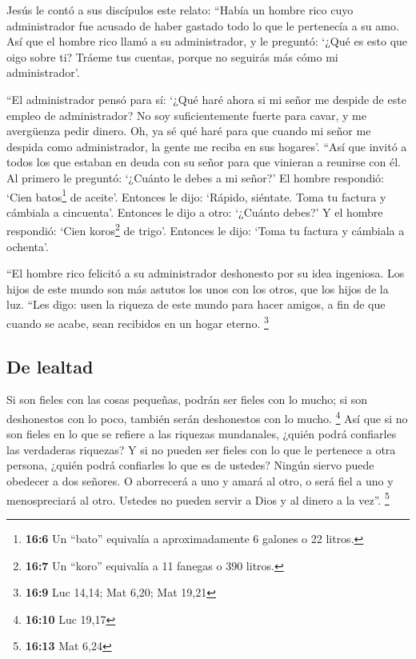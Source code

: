  Jesús le contó a sus discípulos este relato: ``Había un
hombre rico cuyo administrador fue acusado de haber gastado todo lo que
le pertenecía a su amo.  Así que el hombre rico llamó a su
administrador, y le preguntó: `¿Qué es esto que oigo sobre ti? Tráeme
tus cuentas, porque no seguirás más cómo mi administrador'.

 ``El administrador pensó para sí: `¿Qué haré ahora si mi
señor me despide de este empleo de administrador? No soy suficientemente
fuerte para cavar, y me avergüenza pedir dinero.  Oh, ya
sé qué haré para que cuando mi señor me despida como administrador, la
gente me reciba en sus hogares'.  ``Así que invitó a todos
los que estaban en deuda con su señor para que vinieran a reunirse con
él. Al primero le preguntó: `¿Cuánto le debes a mi señor?'
 El hombre respondió: `Cien batos\footnote{\textbf{16:6}
  Un ``bato'' equivalía a aproximadamente 6 galones o 22 litros.} de
aceite'. Entonces le dijo: `Rápido, siéntate. Toma tu factura y cámbiala
a cincuenta'.  Entonces le dijo a otro: `¿Cuánto debes?' Y
el hombre respondió: `Cien koros\footnote{\textbf{16:7} Un ``koro''
  equivalía a 11 fanegas o 390 litros.} de trigo'. Entonces le dijo:
`Toma tu factura y cámbiala a ochenta'.

 ``El hombre rico felicitó a su administrador deshonesto
por su idea ingeniosa. Los hijos de este mundo son más astutos los unos
con los otros, que los hijos de la luz.  ``Les digo: usen
la riqueza de este mundo para hacer amigos, a fin de que cuando se
acabe, sean recibidos en un hogar eterno. \footnote{\textbf{16:9} Luc
  14,14; Mat 6,20; Mat 19,21}

\hypertarget{de-lealtad}{%
\subsection{De lealtad}\label{de-lealtad}}

 Si son fieles con las cosas pequeñas, podrán ser fieles
con lo mucho; si son deshonestos con lo poco, también serán deshonestos
con lo mucho. \footnote{\textbf{16:10} Luc 19,17}  Así
que si no son fieles en lo que se refiere a las riquezas mundanales,
¿quién podrá confiarles las verdaderas riquezas?  Y si no
pueden ser fieles con lo que le pertenece a otra persona, ¿quién podrá
confiarles lo que es de ustedes?  Ningún siervo puede
obedecer a dos señores. O aborrecerá a uno y amará al otro, o será fiel
a uno y menospreciará al otro. Ustedes no pueden servir a Dios y al
dinero a la vez''. \footnote{\textbf{16:13} Mat 6,24}

